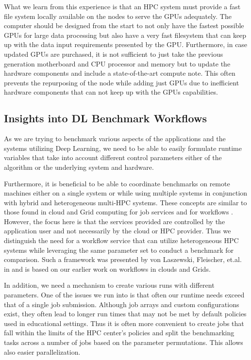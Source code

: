 \documentclass[utf8]{FrontiersinVancouver} %
\begin{document}
  What we learn from this experience is that an HPC system must
  provide a fast file system locally available on the nodes to serve
  the GPUs adequately. The computer should be designed from the start
  to not only have the fastest possible GPUs for large data processing
  but also have a very fast filesystem that can keep up with the data
  input requirements presented by the GPU. Furthermore, in case
  updated GPUs are purchased, it is not sufficient to just take the
  previous generation motherboard and CPU processor and memory but to
  update the hardware components and include a state-of-the-art
  compute note. This often prevents the repurposing of the node while
  adding just GPUs due to inefficient hardware components that can not
  keep up with the GPUs capabilities.

  


\subsection{Insights into DL Benchmark Workflows}
\label{sec:workflow-main}

As we are trying to benchmark various aspects of the applications and
the systems utilizing Deep Learning, we need to be able to easily
formulate runtime variables that take into account different control
parameters either of the algorithm or the underlying system and
hardware.

Furthermore, it is beneficial to be able to coordinate benchmarks on
remote machines either on a single system or while using multiple
systems in conjunction with hybrid and heterogeneous multi-HPC
systems. These concepts are similar to those found in cloud and Grid
computing for job services \citep{las-infogram} and for workflows
\citep{las-workflow,las07-workflow}. However, the focus here is that
the services provided are controlled by the application user and not
necessarily by the cloud or HPC provider. Thus we distinguish the need
for a workflow service that can utilize heterogeneous HPC systems
while leveraging the same parameter set to conduct a benchmark for
comparison. Such a framework was presented by von Laszewski, Fleischer,
et.al. in \citep{las-22-arxiv-workflow-cc} and is based on our earlier
work on workflows in clouds and Grids.

In addition, we need a mechanism to create various runs with different
parameters. One of the issues we run into is that often our runtime
needs exceed that of a single job submission. Although job arrays and
custom configurations exist, they often lead to longer run times that
may not be met by default policies used in educational settings. Thus
it is often more convenient to create jobs that fall within the limits
of the HPC center's policies and split the benchmarking tasks across a
number of jobs based on the parameter permutations. This allows also
easier parallelization.
\end{document}
